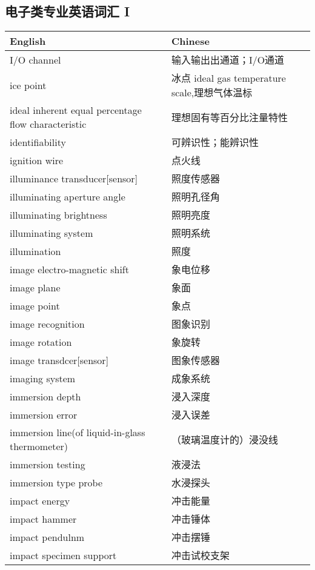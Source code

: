 \documentclass[
]{article}
\begin{document}
\hypertarget{ux7535ux5b50ux7c7bux4e13ux4e1aux82f1ux8bedux8bcdux6c47-i}{%
\subsection{\texorpdfstring{电子类专业英语词汇 I
}{电子类专业英语词汇 I }}\label{ux7535ux5b50ux7c7bux4e13ux4e1aux82f1ux8bedux8bcdux6c47-i}}

\begin{longtable}[]{@{}ll@{}}
\toprule()
English & Chinese \\
\midrule()
\endhead
I/O channel & 输入输出出通道；I/O通道 \\
ice point & 冰点 ideal gas temperature scale,理想气体温标 \\
ideal inherent equal percentage flow characteristic &
理想固有等百分比注量特性 \\
identifiability & 可辨识性；能辨识性 \\
ignition wire & 点火线 \\
illuminance transducer{[}sensor{]} & 照度传感器 \\
illuminating aperture angle & 照明孔径角 \\
illuminating brightness & 照明亮度 \\
illuminating system & 照明系统 \\
illumination & 照度 \\
image electro-magnetic shift & 象电位移 \\
image plane & 象面 \\
image point & 象点 \\
image recognition & 图象识别 \\
image rotation & 象旋转 \\
image transdcer{[}sensor{]} & 图象传感器 \\
imaging system & 成象系统 \\
immersion depth & 浸入深度 \\
immersion error & 浸入误差 \\
immersion line(of liquid-in-glass thermometer) &
（玻璃温度计的）浸没线 \\
immersion testing & 液浸法 \\
immersion type probe & 水浸探头 \\
impact energy & 冲击能量 \\
impact hammer & 冲击锤体 \\
impact pendulnm & 冲击摆锤 \\
impact specimen support & 冲击试校支架 \\

\end{longtable}
\end{document}
